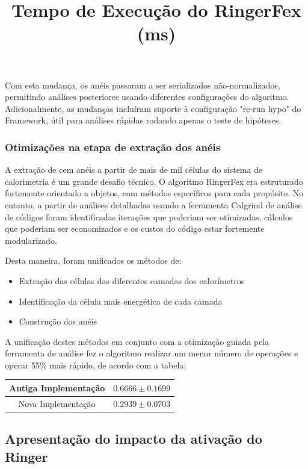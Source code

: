 \documentclass[a4paper,10pt,titlepage]{article}
\begin{document}
Com esta mudança, os anéis passaram a ser serializados não-normalizados, permitindo análises posteriores usando diferentes configurações do algoritmo.
Adicionalmente, as mudanças incluíram suporte à configuração "re-run hypo" do Framework, útil para análises rápidas rodando apenas o teste de hipóteses.

\subsubsection{Otimizações na etapa de extração dos anéis}

A extração de cem anéis a partir de mais de mil células do sistema de calorimetria é um grande desafio técnico.
O algoritmo RingerFex era estruturado fortemente orientado a objetos, com métodos específicos para cada propósito.
No entanto, a partir de análises detalhadas usando a ferramenta Calgrind de análise de códigos foram identificadas iterações que poderiam ser otimizadas, cálculos que poderiam ser economizados e os custos do código estar fortemente modularizado.

Desta maneira, foram unificados os métodos de:
\begin{itemize}
 \item Extração das células das diferentes camadas dos calorímetros
 \item Identificação da célula mais energética de cada camada
 \item Construção dos anéis
\end{itemize}

A unificação destes métodos em conjunto com a otimização guiada pela ferramenta de análise fez o algoritmo realizar um menor número de operações e operar 55\% mais rápido, de acordo com a tabela:

\begin{table}[htbp!]
 \centering
 \title{\textbf{Tempo de Execução do RingerFex (ms)}}
 \begin{tabular}{cc}
  \hline Antiga Implementação & $ 0.6666 \pm 0.1699 $\\
  \hline Nova Implementação & $ 0.2939 \pm 0.0703 $\\
 \end{tabular}
\end{table}

\subsection{Apresentação do impacto da ativação do Ringer}
\end{document}
